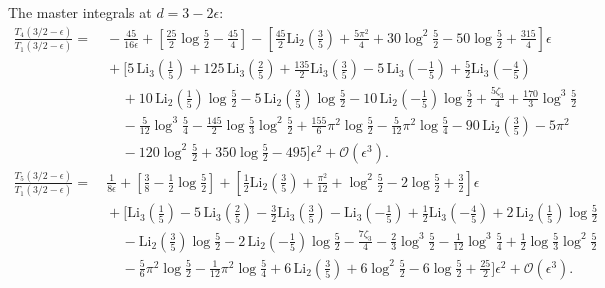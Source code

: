 \documentclass[sort&compress]{elsarticle}
\newcommand{\D}{d}
\begin{document}
The master integrals at $\D=3-2\epsilon$:
\begin{align}
	\frac{T_4(3/2-\epsilon)}{T_1(3/2-\epsilon)} = &\ 
	-\frac{45}{16\epsilon}+\left[\frac{25}{2}\log\frac{5}{2}-\frac{45}{4}\right]
	-\left[\frac{45}{2}\text{Li}_2\left(\frac{3}{5}\right)+\frac{5\pi^2}{4}+30 \log ^2\frac{5}{2}-50 \log \frac{5}{2}+\frac{315}{4}\right]\epsilon \nonumber\\
	&\ + \bigg[5\,\text{Li}_3\!\left(\frac{1}{5}\right)+125\,\text{Li}_3\!\left(\frac{2}{5}\right)+\frac{135}{2}\text{Li}_3\!\left(\frac{3}{5}\right)-5\, \text{Li}_3\!\left(-\frac{1}{5}\right)+\frac{5}{2}\text{Li}_3\!\left(-\frac{4}{5}\right) \nonumber\\
	&\ \ \ \ \ \ +10\,\text{Li}_2\!\left(\frac{1}{5}\right)\log \frac{5}{2}-5\,\text{Li}_2\!\left(\frac{3}{5}\right) \log \frac{5}{2}-10\, \text{Li}_2\!\left(-\frac{1}{5}\right) \log\frac{5}{2}+\frac{5 \zeta_3}{4}+\frac{170}{3} \log ^3\frac{5}{2} \nonumber\\
	&\ \ \ \ \ \ -\frac{5}{12} \log ^3\frac{5}{4}-\frac{145}{2} \log \frac{5}{3} \log ^2\frac{5}{2}+\frac{155}{6} \pi ^2 \log\frac{5}{2}-\frac{5}{12}\pi^2 \log\frac{5}{4}-90\,\text{Li}_2\!\left(\frac{3}{5}\right)-5 \pi ^2 \nonumber\\
	&\ \ \ \ \ \ -120 \log ^2\frac{5}{2}+350 \log \frac{5}{2}-495 \bigg] \epsilon^2 + \mathcal{O}(\epsilon^3).
	\\
	\frac{T_5(3/2-\epsilon)}{T_1(3/2-\epsilon)} =&\ \frac{1}{8\epsilon} + \left[ \frac{3}{8}-\frac{1}{2} \log \frac{5}{2} \right] + \left[ \frac{1}{2}\text{Li}_2\!\left(\frac{3}{5}\right)+\frac{\pi^2}{12}+\log ^2\frac{5}{2}-2 \log \frac{5}{2} +\frac{3}{2} \right]\epsilon \nonumber\\
	&\ + \bigg[ \text{Li}_3\!\left(\frac{1}{5}\right)-5\,\text{Li}_3\!\left(\frac{2}{5}\right)-\frac{3}{2} \text{Li}_3\!\left(\frac{3}{5}\right)-\text{Li}_3\!\left(-\frac{1}{5}\right)+\frac{1}{2}\text{Li}_3\!\left(-\frac{4}{5}\right)+2\, \text{Li}_2\!\left(\frac{1}{5}\right) \log \frac{5}{2} \nonumber\\
	&\ \ \ \ \ \ -\text{Li}_2\!\left(\frac{3}{5}\right) \log \frac{5}{2}-2\,\text{Li}_2\!\left(-\frac{1}{5}\right) \log \frac{5}{2}-\frac{7 \zeta_3}{4}-\frac{2}{3} \log^3\frac{5}{2}-\frac{1}{12} \log ^3\frac{5}{4}+\frac{1}{2} \log \frac{5}{3} \log ^2\frac{5}{2} \nonumber\\
	&\ \ \ \ \ \ -\frac{5}{6} \pi ^2 \log \frac{5}{2}-\frac{1}{12} \pi ^2 \log \frac{5}{4}+ 6\,\text{Li}_2\!\left(\frac{3}{5}\right)+6 \log ^2\frac{5}{2}-6 \log \frac{5}{2} +\frac{25}{2}\bigg]\epsilon^2  + \mathcal{O}(\epsilon^3). \\

\end{align}
\end{document}
